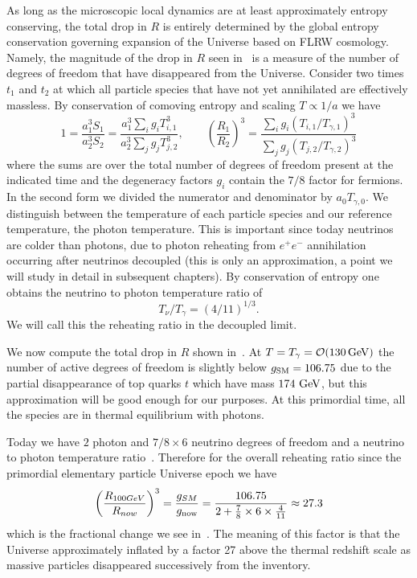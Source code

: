 As long as the microscopic local dynamics are at least approximately entropy conserving, the total drop in $R$ is entirely determined by the global entropy conservation governing expansion of the Universe based on FLRW cosmology. Namely, the magnitude of the drop in $R$ seen in~ is a measure of the number of degrees of freedom that have disappeared from the Universe. Consider two times $t_1$ and $t_2$ at which all particle species that have not yet annihilated are effectively massless. By conservation of comoving entropy and scaling $T\propto 1/a$ we have
\begin{equation}\label{r_ratio}
1=\frac{a_1^3S_{1}}{a_2^3 S_2}=\frac{a_1^3\sum_ig_i T_{i,1}^3}{a_2^3\sum_j g_j T_{j,2}^3},\qquad \left(\frac{R_1}{R_2}\right)^3=\frac{\sum_ig_i (T_{i,1}/T_{\gamma,1})^3}{\sum_j g_j (T_{j,2}/T_{\gamma,2})^3}
\end{equation}
where the sums are over the total number of degrees of freedom present at the indicated time and the degeneracy factors $g_i$ contain the $7/8$ factor for fermions. In the second form we divided the numerator and denominator by $a_{0}T_{\gamma,0}$. We distinguish between the temperature of each particle species and our reference temperature, the photon temperature. This is important since today neutrinos are colder than photons, due to photon reheating from $e^+e^-$ annihilation occurring after neutrinos decoupled (this is only an approximation, a point we will study in detail in subsequent chapters). By conservation of entropy one obtains the neutrino to photon temperature ratio of
\begin{equation}\label{T_nu_T_gamma}
T_\nu/T_\gamma=({4}/{11})^{1/3}.
\end{equation}
We will call this the reheating ratio in the decoupled limit. 

We now compute the total drop in $R$ shown in~. At $T=T_\gamma=\mathcal{O}(130\text{\,GeV})$ the number of active degrees of freedom is slightly below $g_{\rm SM}=106.75$ due to the partial disappearance of top quarks $t$ which have mass $174\,\text{\,GeV}$, but this approximation will be good enough for our purposes. At this primordial time, all the species are in thermal equilibrium with photons.

Today we have $2$ photon and $7/8\times 6$ neutrino degrees of freedom and a neutrino to photon temperature ratio~. Therefore for the overall reheating ratio since the primordial elementary particle Universe epoch we have
\begin{equation}
\left(\frac{R_{100GeV}}{R_{now}}\right)^3= \frac{g_{SM}}{g_{\rm now}}=\frac{106.75}{2+\frac{7}{8}\times 6\times \frac{4}{11}}\approx 27.3
\end{equation}
which is the fractional change we see in~. The meaning of this factor is that the Universe approximately inflated by a factor 27 above the thermal redshift scale as massive particles disappeared successively from the inventory. 

